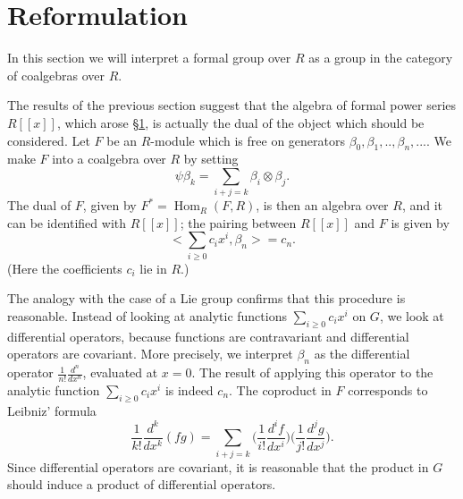 \documentclass[../main]{subfiles}
\begin{document}
\chapter{Reformulation}
\label{sec:p2c3}

In this section we will interpret a formal group over $R$ as a group in the category of coalgebras over $R$.

The results of the previous section suggest that the algebra of formal power series $R[[x]]$, which arose \hyperref[sec:p2c1]{\S 1}, is actually the dual of the object which should be considered. Let $F$ be an $R$-module which is free on generators $\beta_0,\beta_1,..,\beta_n,...$. We make $F$ into a coalgebra over $R$ by setting
\begin{equation}
\label{eqn:p2c03.1}
\tag{3.1}
\psi\beta_k=\sum_{i+j=k}\beta_i\otimes\beta_j.
\end{equation}
The dual of $F$, given by $F^\ast=\operatorname{Hom}_R(F,R)$, is then an algebra over $R$, and it can be identified with $R[[x]]$; the pairing between $R[[x]]$ and $F$ is given by 
\begin{equation}
\label{eqn:p2c03.2}
\tag{3.2}
\Big<\sum_{i\geq 0}c_ix^i,\beta_n\Big>=c_n.    
\end{equation}
(Here the coefficients $c_i$ lie in $R$.)

The analogy with the case of a Lie group confirms that this procedure is reasonable. Instead of looking at analytic functions $\displaystyle\sum_{i\geq 0}c_ix^i$ on $G$, we look at differential operators, because functions are contravariant and differential operators are covariant. More precisely, we interpret $\beta_n$ as the differential operator $\frac{1}{n!}\frac{d^n}{dx^n}$, evaluated at $x=0$. The result of applying this operator to the analytic function $\displaystyle\sum_{i\geq 0}c_ix^i$ is indeed $c_n$. The coproduct in $F$ corresponds to Leibniz' formula
\[\frac{1}{k!}\frac{d^k}{dx^k}(fg)=\sum_{i+j=k}\Big(\frac{1}{i!}\frac{d^i f}{dx^i}\Big)\Big(\frac{1}{j!}\frac{d^j g}{dx^j}\Big).\]
Since differential operators are covariant, it is reasonable that the product in $G$ should induce a product of differential operators. 
\end{document}
